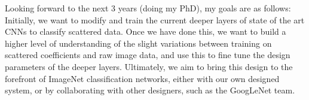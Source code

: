 \documentclass[12pt, a4paper, oneside, english]{article}
\begin{document}
Looking forward to the next 3 years (doing my PhD), my goals are as follows: \\
Initially, we want to modify and train the current deeper layers of state of the art CNNs to classify scattered data. Once we have done this, we want to build a higher level of understanding of the slight variations between training on scattered coefficients and raw image data, and use this to fine tune the design parameters of the deeper layers. Ultimately, we aim to bring this design to the forefront of ImageNet classification networks, either with our own designed system, or by collaborating with other designers, such as the GoogLeNet team.
%
%
%
%
%
\end{document}
